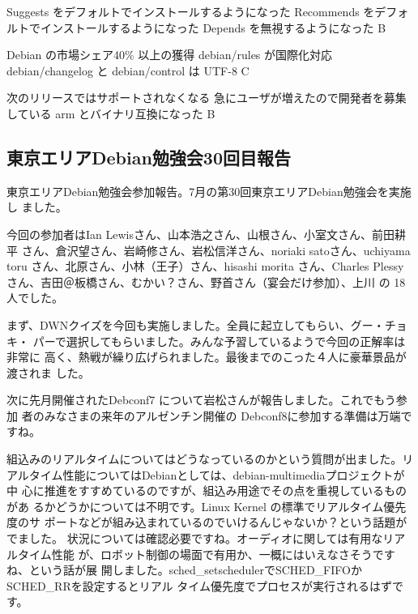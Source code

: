 \documentclass[mingoth,a4paper]{jsarticle}
\begin{document}
{Suggests  をデフォルトでインストールするようになった}
{Recommends をデフォルトでインストールするようになった}
{Depends を無視するようになった}
{B}

{Debian の市場シェア40\% 以上の獲得}
{debian/rules が国際化対応}
{debian/changelog と debian/control は UTF-8}
{C}

{次のリリースではサポートされなくなる}
{急にユーザが増えたので開発者を募集している}
{arm とバイナリ互換になった}
{B}



\subsection{東京エリアDebian勉強会30回目報告}

東京エリアDebian勉強会参加報告。7月の第30回東京エリアDebian勉強会を実施し
ました。

今回の参加者はIan Lewisさん、山本浩之さん、山根さん、小室文さん、前田耕平
さん、倉沢望さん、岩崎修さん、岩松信洋さん、noriaki satoさん、uchiyama
toru さん、北原さん、小林（王子）さん、hisashi morita さん、Charles
Plessy さん、吉田＠板橋さん、むかい？さん、野首さん（宴会だけ参加）、上川
の 18 人でした。

まず、DWNクイズを今回も実施しました。全員に起立してもらい、グー・チョキ・
パーで選択してもらいました。みんな予習しているようで今回の正解率は非常に
高く、熱戦が繰り広げられました。最後までのこった４人に豪華景品が渡されま
した。

次に先月開催されたDebconf7 について岩松さんが報告しました。これでもう参加
者のみなさまの来年のアルゼンチン開催の Debconf8に参加する準備は万端ですね。

組込みのリアルタイムについてはどうなっているのかという質問が出ました。リ
アルタイム性能についてはDebianとしては、debian-multimediaプロジェクトが中
心に推進をすすめているのですが、組込み用途でその点を重視しているものがあ
るかどうかについては不明です。Linux Kernel の標準でリアルタイム優先度のサ
ポートなどが組み込まれているのでいけるんじゃないか？という話題がでました。
状況については確認必要ですね。オーディオに関しては有用なリアルタイム性能
が、ロボット制御の場面で有用か、一概にはいえなさそうですね、という話が展
開しました。sched\_setschedulerでSCHED\_FIFOかSCHED\_RRを設定するとリアル
タイム優先度でプロセスが実行されるはずです。
\end{document}
